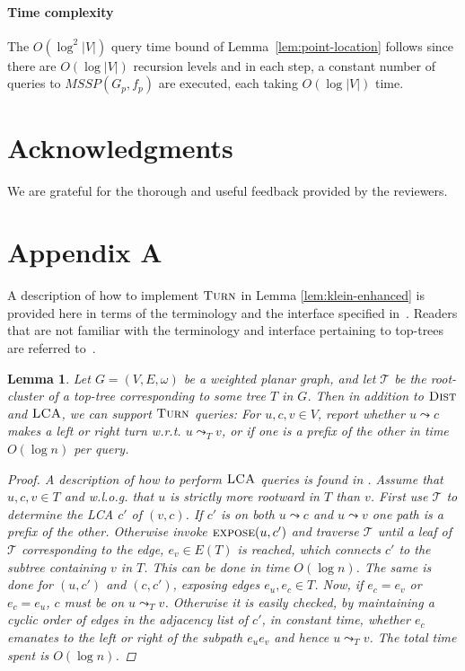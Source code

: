 \documentclass[a4paper,UKenglish,cleveref, autoref, thm-restate]{article}
\newtheorem{lemma}{Lemma}
\begin{document}
\paragraph*{Time complexity}
The $O(\log^2|V|)$ query time bound of Lemma~\ref{lem:point-location} follows since there are $O(\log|V|)$ recursion levels and in each step, a constant number of queries to $\textit{MSSP}(G_p,f_p)$ are executed, each taking $O(\log |V|)$ time.


\section{Acknowledgments}
We are grateful for the thorough and useful feedback provided by the reviewers.

\newpage

\newpage

\section*{Appendix A}\label{sec:appendix}
A description of how to implement $\textsc{Turn}$ in Lemma \ref{lem:klein-enhanced} is provided here in terms of the terminology and the interface specified in~\cite{Holm2003}. Readers that are not familiar with the terminology and interface pertaining to top-trees are referred to~\cite{Holm2003}.

\begin{lemma}\label{lem:turn}
Let $G=(V,E,\omega)$ be a weighted planar graph, and let $\mathcal{T}$ be the root-cluster of a top-tree corresponding to some tree $T$ in $G$. Then in addition to $\textsc{Dist}$ and $\textsc{LCA}$, we can support $\textsc{Turn}$ queries: For $u,c,v \in V$, report whether $u \leadsto c$ makes a left or right turn w.r.t. $u \leadsto_T v$, or if one is a prefix of the other in time $O(\log n)$ per query.
\begin{proof}
A description of how to perform $\textsc{LCA}$ queries is found in \cite{Holm2003}. Assume that $u,c,v \in T$ and w.l.o.g. that $u$ is strictly more rootward in $T$ than $v$. First use $\mathcal{T}$ to determine the LCA $c'$ of $(v,c)$. If $c'$ is on both $u \leadsto c$ and $u \leadsto v$ one path is a prefix of the other. Otherwise invoke $\textsc{expose}(u,c')$ and traverse $\mathcal{T}$ until a leaf of $\mathcal{T}$ corresponding to the edge, $e_{v} \in E(T)$ is reached, which connects $c'$ to the subtree containing $v$ in $T$. This can be done in time $O(\log n)$. The same is done for $(u,c')$ and $(c,c')$, exposing edges $e_u, e_c \in T$. Now, if $e_c = e_v$ or $e_c = e_u$, $c$ must be on $u \leadsto_T v$. Otherwise it is easily checked, by maintaining a cyclic order of edges in the adjacency list of $c'$, in constant time, whether $e_c$ emanates to the left or right of the subpath $e_ue_v$ and hence $u \leadsto_T v$. The total time spent is $O(\log n)$.
\end{proof}
\end{lemma}
\end{document}
